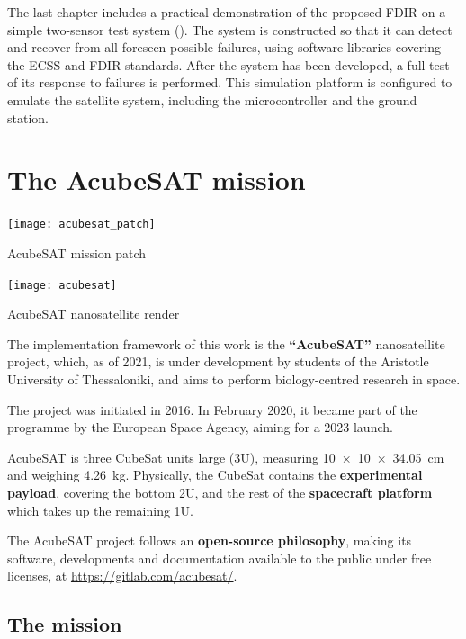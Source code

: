 \documentclass[a4paper,nobib]{tufte-book}
\begin{document}
The last chapter includes a practical demonstration of the proposed \acs{FDIR} on a simple two-sensor test system (). The system is constructed so that it can detect and recover from all foreseen possible failures, using software libraries covering the \acs{ECSS} and \acs{FDIR} standards. After the system has been developed, a full test of its response to failures is performed. This simulation platform is configured to emulate the satellite system, including the microcontroller and the ground station.

\chapter{The AcubeSAT mission}
\label{cap:acubesat}

\begin{marginfigure}
    \texttt{[image: acubesat\_patch]}
    \caption{AcubeSAT mission patch}
\end{marginfigure}

\begin{marginfigure}
    \centering
    \texttt{[image: acubesat]}
    \caption{AcubeSAT nanosatellite render}
\end{marginfigure}


The implementation framework of this work is the \textbf{``AcubeSAT''} nanosatellite project, which, as of 2021, is under development by students of the Aristotle University of Thessaloniki, and aims to perform biology-centred research in space.

The project was initiated in 2016. In February 2020, it became part of the  programme by the European Space Agency, aiming for a 2023 launch.

AcubeSAT is three CubeSat units large (3U), measuring \linebreak[4]\SI[product-units = single]{10 x 10 x 34.05}{\centi\metre} and weighing \SI{4.26}{\kilo\gram}. Physically, the CubeSat contains the \textbf{experimental payload}, covering the bottom 2U, and the rest of the \textbf{spacecraft platform} which takes up the remaining 1U.

The AcubeSAT project follows an \textbf{open-source philosophy}, making its software, developments and documentation available to the public under free licenses, at \url{https://gitlab.com/acubesat/}.

\section{The mission}
\end{document}
